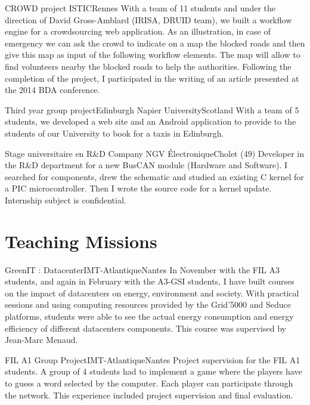 \documentclass[11pt,a4paper]{moderncv}
\begin{document}
  {CROWD project}
  {ISTIC}{Rennes}{}
  {With a team of 11 students and under the direction of David Gross-Amblard (IRISA, DRUID team), we built a workflow engine for a crowdsourcing web application. As an illustration, in case of emergency we can ask the crowd to indicate on a map the blocked roads and then give this map as input of the following workflow elements. The map will allow to find volunteers nearby the blocked roads to help the authorities. Following the completion of the project, I participated in the writing of an article presented at the 2014 BDA conference.}
\vspace{0.6em}
  
  {Third year group project}{Edinburgh Napier University}{Scotland}{}
  {With a team of 5 students, we developed a web site and an Android application to provide to the students of our University to book for a taxis in Edinburgh.}
\vspace{0.6em}
  
  {Stage universitaire en R\&D}
  {Company NGV Électronique}{Cholet (49)}{}
  {Developer in the R\&D department for a new BusCAN module (Hardware and Software). I searched for components, drew the schematic and studied an existing C kernel for a PIC microcontroller. Then I wrote the source code for a kernel update. Internship subject is confidential.}
\vspace{1.2em}

\newpage
\section{Teaching Missions}

  {GreenIT : Datacenter}{IMT-Atlantique}{Nantes}{}
  {In November with the FIL A3 students, and again in February with the A3-GSI students, I have built courses on the impact of datacenters on energy, environment and society. With practical sessions and using computing resources provided by the Grid'5000 and Seduce platforms, students were able to see the actual energy consumption and energy efficiency of different datacenters components. This course was supervised by Jean-Marc Menaud.}
\vspace{0.6em}

  {FIL A1 Group Project}{IMT-Atlantique}{Nantes}{}
  {Project supervision for the FIL A1 students. A group of 4 students had to implement a game where the players have to guess a word selected by the computer. Each player can participate through the network. This experience included project supervision and final evaluation.}
\vspace{0.6em}
\end{document}

